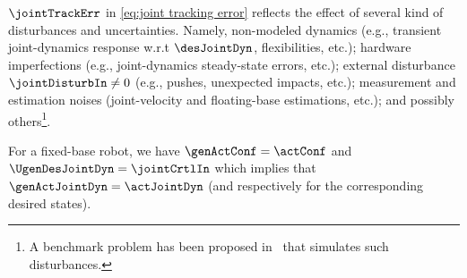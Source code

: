$\jointTrackErr$ in \cref{eq:joint tracking error} reflects the effect of several kind of disturbances and uncertainties. Namely, non-modeled dynamics (e.g., transient joint-dynamics response w.r.t $\desJointDyn$, flexibilities, etc.); hardware imperfections (e.g., joint-dynamics steady-state errors, etc.); external disturbance $\jointDisturbIn\neq0$ (e.g., pushes, unexpected impacts, etc.); measurement and  estimation noises (joint-velocity and floating-base estimations, etc.); and possibly others\footnote{A benchmark problem has been proposed in~\cite{moberg2009tcst} that simulates such disturbances.}.
\begin{remark}\label{rem:fixed-base robot case}
	For a fixed-base robot, we have $\genActConf=\actConf$ and  $\UgenDesJointDyn = \jointCrtlIn$ which implies that $\genActJointDyn = \actJointDyn$ (and respectively for the corresponding desired states).
\end{remark}
	



